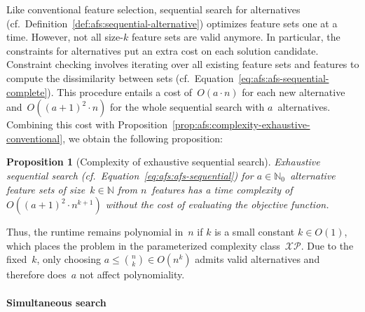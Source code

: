\documentclass{article}
\newtheorem{proposition}{Proposition}
\theoremstyle{definition}
\begin{document}
Like conventional feature selection, sequential search for alternatives (cf.~Definition~\ref{def:afs:sequential-alternative}) optimizes feature sets one at a time.
However, not all size-$k$ feature sets are valid anymore.
In particular, the constraints for alternatives put an extra cost on each solution candidate.
Constraint checking involves iterating over all existing feature sets and features to compute the dissimilarity between sets (cf.~Equation~\ref{eq:afs:afs-sequential-complete}).
This procedure entails a cost of~$O(a \cdot n)$ for each new alternative and~$O((a+1)^2 \cdot n)$ for the whole sequential search with $a$~alternatives.
Combining this cost with Proposition~\ref{prop:afs:complexity-exhaustive-conventional}, we obtain the following proposition:
%
\begin{proposition}[Complexity of exhaustive sequential search]
	Exhaustive sequential search (cf.~Equation~\ref{eq:afs:afs-sequential}) for $a \in \mathbb{N}_0$~alternative feature sets of size~$k \in \mathbb{N}$ from $n$~features has a time complexity of~$O((a+1)^2 \cdot n^{k+1})$ without the cost of evaluating the objective function.
	\label{prop:afs:complexity-exhaustive-sequential}
\end{proposition}
%
Thus, the runtime remains polynomial in~$n$ if $k$ is a small constant $k \in O(1)$, which places the problem in the parameterized complexity class~$\mathcal{XP}$.
Due to the fixed~$k$, only choosing $a \leq \binom{n}{k} \in O(n^k)$ admits valid alternatives and therefore does~$a$ not affect polynomiality.

\paragraph{Simultaneous search}
\end{document}
